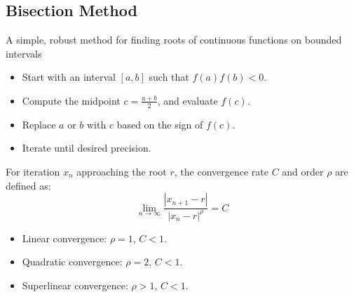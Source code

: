 \subsection{Bisection Method}
\begin{definition}
    A simple, robust method for finding roots of continuous functions on bounded intervals
    \begin{itemize}
        \item Start with an interval $[a, b]$ such that $f(a)f(b) < 0$.
        \item Compute the midpoint $c = \frac{a + b}{2}$, and evaluate $f(c)$.
        \item Replace $a$ or $b$ with $c$ based on the sign of $f(c)$.
        \item Iterate until desired precision.
    \end{itemize}
\end{definition}
\begin{definition}
    For iteration $x_n$ approaching the root $r$, the convergence rate $C$ and order $\rho$ are defined as: 
    $$\lim_{n \to \infty} \frac{|x_{n+1} - r|}{|x_n - r|^\rho} = C$$
    \begin{itemize}
        \item Linear convergence: $\rho = 1$, $C < 1$.
        \item Quadratic convergence: $\rho = 2$, $C < 1$.
        \item Superlinear convergence: $\rho > 1$, $C < 1$.
    \end{itemize}
\end{definition}

